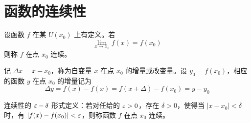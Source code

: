 
\section{函数的连续性}

\begin{definition}[连续性]
	设函数 $f$ 在某 $U(x_0)$ 上有定义。若
	\[ \lim_{x\to x_0}f(x) = f(x_0) \]
	则称 $f$ 在点 $x_0$ 连续。
\end{definition}

记 $\Delta x = x-x_0$，称为自变量 $x$ 在点 $x_0$ 的增量或改变量。设 $y_0=f(x_0)$，相应的函数 $y$ 在点 $x_0$ 的增量记为
\[ \Delta y = f(x)-f(x) = f(x+\Delta)-f(x_0) = y-y_0 \]

连续性的 $\varepsilon-\delta$ 形式定义：若对任给的 $\varepsilon>0$，存在 $\delta>0$，使得当 $|x-x_0|<\delta$ 时，有 $|f(x)-f(x_0)|<\varepsilon$，则称函数 $f$ 在点 $x_0$ 连续。

